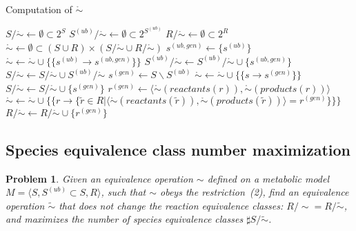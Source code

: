 \documentclass[10pt]{bmc_article}
\newenvironment{bmcformat}{\baselineskip20pt\sloppy\setboolean{publ}{false}}{\baselineskip20pt\sloppy}
\begin{document}
\begin{bmcformat}
\begin{algorithm}[H]
\SetAlgoVlined
{}
\caption{Computation of $\mathring{\sim}$}
\BlankLine
$S/{\mathring{\sim}} \leftarrow \emptyset \subset 2^S$ \;
$S^{(ub)}/{\mathring{\sim}} \leftarrow \emptyset \subset 2^{S^{(ub)}}$ \;
$R/{\mathring{\sim}} \leftarrow \emptyset \subset 2^R$ \;
$\mathring{\sim} \leftarrow \emptyset \subset (S\cup{R})\times(S/{\mathring{\sim}}\cup{R/{\mathring{\sim}}})$ \;
\BlankLine
{} {
	$s^{(ub, gen)} \leftarrow \{s^{(ub)}\}$ \;
	$\mathring{\sim}  \leftarrow \mathring{\sim}\cup\{\{s^{(ub)} \rightarrow s^{(ub, gen)}\}\}$ \;
	$S^{(ub)}/{\mathring{\sim}} \leftarrow S^{(ub)}/{\mathring{\sim}}\cup\{s^{(ub, gen)}\}$ \;
}
\BlankLine
$S/{\mathring{\sim}} \leftarrow S/{\mathring{\sim}}\cup{S^{(ub)}/{\mathring{\sim}}}$ \;
\BlankLine
$s^{(gen)} \leftarrow S \backslash S^{(ub)}$ \;
 {
	$\mathring{\sim}  \leftarrow \mathring{\sim}\cup\{\{s \rightarrow s^{(gen)}\}\}$ \;
}
$S/{\mathring{\sim}} \leftarrow S/{\mathring{\sim}}\cup\{s^{(gen)}\}$ \;
\BlankLine
{} {
	$r^{(gen)} \leftarrow \langle\mathring{\sim}(reactants(r)), \mathring{\sim}(products(r))\rangle$ \;
	$\mathring{\sim} \leftarrow \mathring{\sim}\cup\{\{r \rightarrow \{\tilde{r} \in R|\langle\mathring{\sim}(reactants(\tilde{r})), \mathring{\sim}(products(\tilde{r}))\rangle = r^{(gen)}\}\}\}$ \;
	$R/{\mathring{\sim}} \leftarrow R/{\mathring{\sim}}\cup\{r^{(gen)}\}$ \;
}
\BlankLine
{}
\end{algorithm} 

\subsection*{Species equivalence class number maximization}
\newtheorem{p1}{Problem}
\begin{p1}
Given an equivalence operation $\sim$ defined on a metabolic model $M=\langle S, S^{(ub)}\subset{S}, R \rangle$, such that $\sim$ obeys the restriction~(2), find an equivalence operation $\tilde{\sim}$ that does not change the reaction equivalence classes: $R/\sim = R/\tilde{\sim}$, and maximizes the number of species equivalence classes $\sharp S/\tilde{\sim}$. 
\end{p1}


\end{bmcformat}
\end{document}
